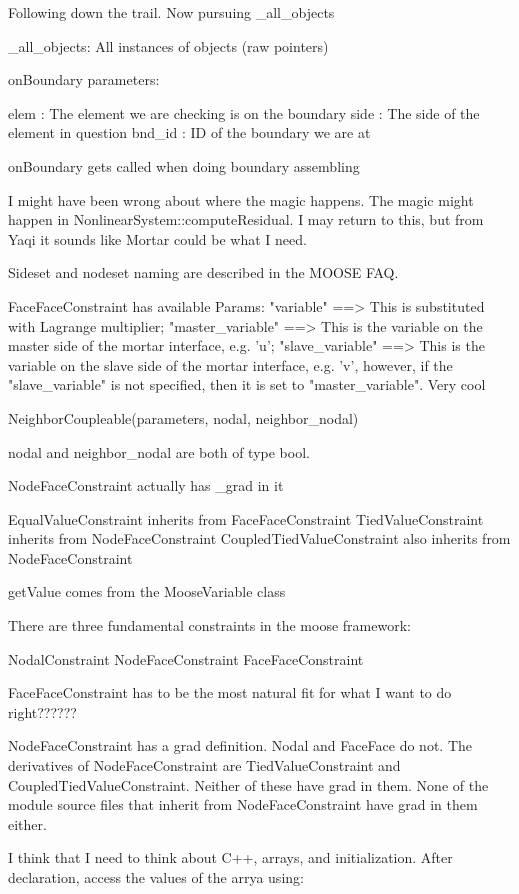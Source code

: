 Following down the trail. Now pursuing _all_objects

_all_objects: All instances of objects (raw pointers)

onBoundary parameters:

elem : The element we are checking is on the boundary
side : The side of the element in question
bnd_id : ID of the boundary we are at

onBoundary gets called when doing boundary assembling

I might have been wrong about where the magic happens. The magic might happen in NonlinearSystem::computeResidual. I may return to this, but from Yaqi it sounds like Mortar could be what I need.

Sideset and nodeset naming are described in the MOOSE FAQ.

FaceFaceConstraint has available Params: "variable" ==> This is substituted with Lagrange multiplier; "master_variable" ==> This is the variable on the master side of the mortar interface, e.g. 'u'; "slave_variable" ==> This is the variable on the slave side of the mortar interface, e.g. 'v', however, if the "slave_variable" is not specified, then it is set to "master_variable".  Very cool

 NeighborCoupleable(parameters, nodal, neighbor_nodal)

nodal and neighbor_nodal are both of type bool.

NodeFaceConstraint actually has _grad in it

EqualValueConstraint inherits from FaceFaceConstraint
TiedValueConstraint inherits from NodeFaceConstraint
CoupledTiedValueConstraint also inherits from NodeFaceConstraint

getValue comes from the MooseVariable class

There are three fundamental constraints in the moose framework:

NodalConstraint
NodeFaceConstraint
FaceFaceConstraint

FaceFaceConstraint has to be the most natural fit for what I want to do right??????

NodeFaceConstraint has a grad definition. Nodal and FaceFace do not. The derivatives of NodeFaceConstraint are TiedValueConstraint and CoupledTiedValueConstraint. Neither of these have grad in them. None of the module source files that inherit from NodeFaceConstraint have grad in them either.

I think that I need to think about C++, arrays, and initialization. After declaration, access the values of the arrya using:

